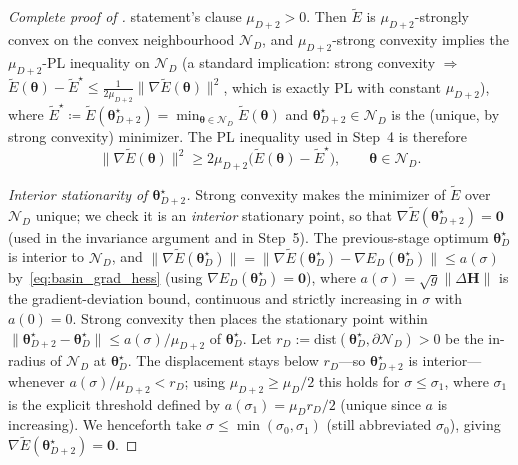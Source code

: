 \documentclass[11pt]{article}
\newcommand{\cN}{\mathcal{N}}
\theoremstyle{plain}
\theoremstyle{plain}
\begin{document}
\begin{proof}[Complete proof of ]
statement's clause $\mu_{D+2}>0$.
Then $\widetilde{E}$ is
$\mu_{D+2}$-strongly convex on the convex neighbourhood $\cN_D$, and
$\mu_{D+2}$-strong convexity implies the $\mu_{D+2}$-PL inequality on
$\cN_D$ (a standard implication: strong convexity $\Rightarrow$
$\widetilde{E}(\bm\theta)-\widetilde{E}^\star
\le\tfrac{1}{2\mu_{D+2}}\|\nabla\widetilde{E}(\bm\theta)\|^2$, which is
exactly PL with constant $\mu_{D+2}$), where
$\widetilde{E}^\star\coloneqq\widetilde{E}(\bm\theta_{D+2}^\star)
=\min_{\bm\theta\in\cN_D}\widetilde{E}(\bm\theta)$ and
$\bm\theta_{D+2}^\star\in\cN_D$ is the (unique, by strong convexity)
minimizer.  The PL inequality used in Step~4 is therefore
\begin{equation}\label{eq:basin_PL}
  \|\nabla\widetilde{E}(\bm\theta)\|^2
  \ge 2\mu_{D+2}\bigl(\widetilde{E}(\bm\theta)-\widetilde{E}^\star\bigr),
  \qquad\bm\theta\in\cN_D.
\end{equation}

\emph{Interior stationarity of $\bm\theta_{D+2}^\star$.}
Strong convexity makes the minimizer of $\widetilde{E}$ over $\cN_D$
unique; we check it is an \emph{interior} stationary point, so that
$\nabla\widetilde{E}(\bm\theta_{D+2}^\star)=\bm 0$ (used in the
invariance argument and in Step~5).  The previous-stage optimum
$\bm\theta_D^\star$ is interior to $\cN_D$, and
$\|\nabla\widetilde{E}(\bm\theta_D^\star)\|
=\|\nabla\widetilde{E}(\bm\theta_D^\star)-\nabla E_D(\bm\theta_D^\star)\|
\le a(\sigma)$ by~\eqref{eq:basin_grad_hess} (using
$\nabla E_D(\bm\theta_D^\star)=\bm 0$), where $a(\sigma)=\sqrt{g} \|\Delta\mathbf{H}\|$
is the gradient-deviation bound, continuous and strictly increasing in
$\sigma$ with $a(0)=0$.  Strong convexity then places the stationary point
within $\|\bm\theta_{D+2}^\star-\bm\theta_D^\star\|\le a(\sigma)/\mu_{D+2}$
of $\bm\theta_D^\star$.  Let $r_D:=\mathrm{dist}(\bm\theta_D^\star,\partial\cN_D)>0$
be the in-radius of $\cN_D$ at $\bm\theta_D^\star$.  The displacement stays
below $r_D$---so $\bm\theta_{D+2}^\star$ is interior---whenever
$a(\sigma)/\mu_{D+2}<r_D$; using $\mu_{D+2}\ge\mu_D/2$ this holds for
$\sigma\le\sigma_1$, where $\sigma_1$ is the explicit threshold defined by
$a(\sigma_1)=\mu_D r_D/2$ (unique since $a$ is increasing).  We henceforth
take $\sigma\le\min(\sigma_0,\sigma_1)$ (still abbreviated $\sigma_0$), giving
$\nabla\widetilde{E}(\bm\theta_{D+2}^\star)=\bm 0$.


\end{proof}
\end{document}
